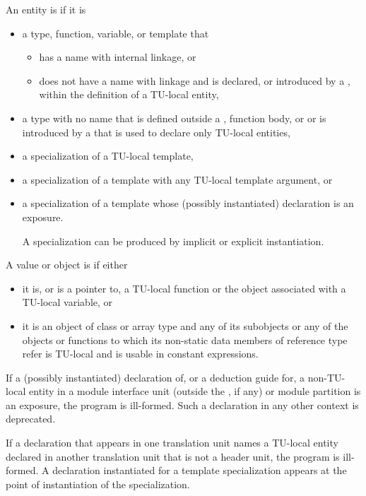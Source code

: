 \pnum
An entity is  if it is
\begin{itemize}
\item
a type, function, variable, or template that
\begin{itemize}
\item
has a name with internal linkage, or
\item
does not have a name with linkage and is declared,
or introduced by a ,
within the definition of a TU-local entity,
\end{itemize}
\item
a type with no name that is defined outside a
,
function body, or
or is introduced by a 
that is used to declare only TU-local entities,
\item
a specialization of a TU-local template,
\item
a specialization of a template with any TU-local template argument, or
\item
a specialization of a template
whose (possibly instantiated) declaration is an exposure.
\begin{note}
A specialization can be produced by implicit or explicit instantiation.
\end{note}
\end{itemize}

\pnum
A value or object is  if either
\begin{itemize}
\item
it is, or is a pointer to,
a TU-local function or the object associated with a TU-local variable, or
\item
it is an object of class or array type and
any of its subobjects or
any of the objects or functions
to which its non-static data members of reference type refer
is TU-local and is usable in constant expressions.
\end{itemize}

\pnum
If a (possibly instantiated) declaration of, or a deduction guide for,
a non-TU-local entity in a module interface unit
(outside the , if any) or
module partition is an exposure,
the program is ill-formed.
Such a declaration in any other context is deprecated.

\pnum
If a declaration that appears in one translation unit
names a TU-local entity declared
in another translation unit that is not a header unit,
the program is ill-formed.
A declaration instantiated for a template specialization
appears at the point of instantiation of the specialization.

